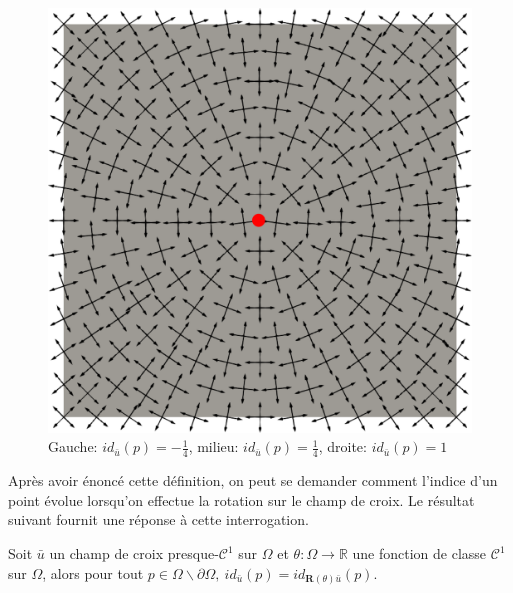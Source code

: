 \begin{figure}[!h]
  \hfill
  \includegraphics[scale=0.1765]{images/index_1.pdf}
  \caption{Gauche: $id_{\bar{u}}(p)=-\frac{1}{4}$, milieu: $id_{\bar{u}}(p)=\frac{1}{4}$, droite: $id_{\bar{u}}(p)=1$}
  \label{fig:index_illustration}
\end{figure}

Après avoir énoncé cette définition, on peut se demander comment l'indice d'un point évolue lorsqu'on effectue la rotation sur le champ de croix. Le résultat suivant fournit une réponse à cette interrogation.

\begin{proposition}
\label{prop:relation_u_Rthetau}
Soit $\bar{u}$ un champ de croix presque-$\mathcal{C}^1$ sur $\Omega$ et $\theta:\Omega \rightarrow \mathbb{R}$ une fonction de classe $\mathcal{C}^1$ sur $\Omega$, alors pour tout $p\in \Omega\backslash\partial\Omega,~id_{\bar{u}}(p)=id_{\mathbf{R}(\theta)\bar{u}}(p)$.
\end{proposition}

